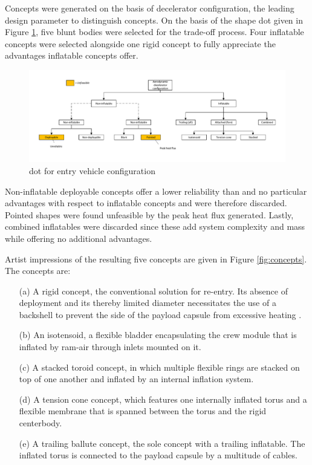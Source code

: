 Concepts were generated on the basis of decelerator configuration, the leading design parameter to distinguish concepts. On the basis of the shape \acrfull{dot} given in Figure \ref{fig:dotshape}, five blunt bodies were selected for the trade-off process. Four inflatable concepts were selected alongside one rigid concept to fully appreciate the advantages inflatable concepts offer.

\begin{figure}[H]
\hspace{-23mm}
\includegraphics[width = 1.25\textwidth]{Figure/Concepts/DOT_configuration.pdf}
\vspace{-5mm}
\caption{\acrfull{dot} for entry vehicle configuration}
\label{fig:dotshape}
\end{figure}

Non-inflatable deployable concepts offer a lower reliability than and no particular advantages with respect to inflatable concepts and were therefore discarded. Pointed shapes were found unfeasible by the peak heat flux generated. Lastly, combined inflatables were discarded since these add system complexity and mass while offering no additional advantages. 

Artist impressions of the resulting five concepts are given in Figure \ref{fig:concepts}. The concepts are:
\begin{itemize}
\item[(a)] A rigid concept, the conventional solution for re-entry. Its absence of deployment and its thereby limited diameter necessitates the use of a backshell to prevent the side of the payload capsule from excessive heating \cite{Hughes2005}.
\item[(b)] An isotensoid, a flexible bladder encapsulating the crew module that is inflated by ram-air through inlets mounted on it.
\item[(c)] A stacked toroid concept, in which multiple flexible rings are stacked on top of one another and inflated by an internal inflation system.
\item[(d)] A tension cone concept, which features one internally inflated torus and a flexible membrane that is spanned between the torus and the rigid centerbody.
\item[(e)] A trailing ballute concept, the sole concept with a trailing inflatable. The inflated torus is connected to the payload capsule by a multitude of cables.
\end{itemize}

